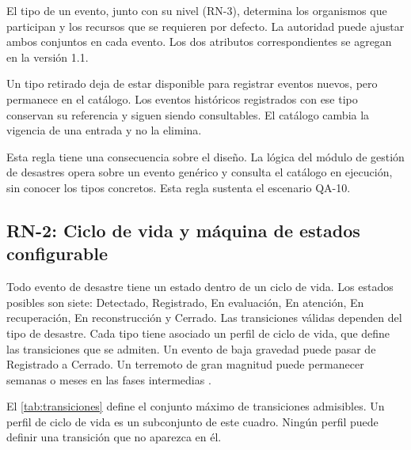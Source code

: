 \documentclass[11pt,letterpaper]{article}
\begin{document}
El tipo de un evento, junto con su nivel (RN-3), determina los organismos que participan y los
recursos que se requieren por defecto. La autoridad puede ajustar ambos conjuntos en cada evento.
Los dos atributos correspondientes se agregan en la versión 1.1.

Un tipo retirado deja de estar disponible para registrar eventos nuevos, pero permanece en el
catálogo. Los eventos históricos registrados con ese tipo conservan su referencia y siguen siendo
consultables. El catálogo cambia la vigencia de una entrada y no la elimina.

Esta regla tiene una consecuencia sobre el diseño. La lógica del módulo de gestión de desastres
opera sobre un evento genérico y consulta el catálogo en ejecución, sin conocer los tipos concretos.
Esta regla sustenta el escenario QA-10.

\subsection{RN-2: Ciclo de vida y máquina de estados configurable}

Todo evento de desastre tiene un estado dentro de un ciclo de vida. Los estados posibles son siete:
Detectado, Registrado, En evaluación, En atención, En recuperación, En reconstrucción y Cerrado.
Las transiciones válidas dependen del tipo de desastre. Cada tipo tiene asociado un perfil de ciclo
de vida, que define las transiciones que se admiten. Un evento de baja gravedad puede pasar de
Registrado a Cerrado. Un terremoto de gran magnitud puede permanecer semanas o meses en las fases
intermedias \cite{enunciado}.

El \cref{tab:transiciones} define el conjunto máximo de transiciones admisibles. Un perfil de ciclo
de vida es un subconjunto de este cuadro. Ningún perfil puede definir una transición que no
aparezca en él.
\end{document}
